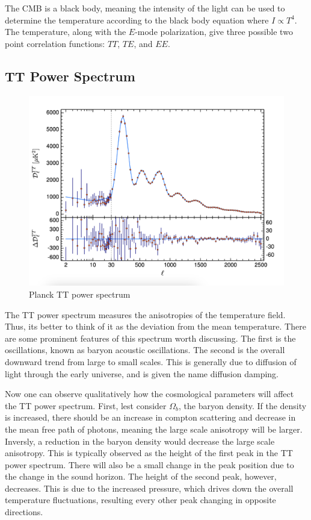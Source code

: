 The CMB is a black body, meaning the intensity of the light can be used to determine the temperature according to the black body equation where $I \propto T^4$. The temperature, along with the $E$-mode polarization, give three possible two point correlation functions: $TT$, $TE$, and $EE$.
\subsection{TT Power Spectrum}
\begin{figure}
    \centering
    \includegraphics[width=12cm]{plots/Planck_TT.png}
    \caption{Planck TT power spectrum}
    \label{fig:planck_tt}
\end{figure}
The TT power spectrum measures the anisotropies of the temperature field. Thus, its better to think of it as the deviation from the mean temperature. There are some prominent features of this spectrum worth discussing. The first is the oscillations, known as baryon acoustic oscillations. The second is the overall downward trend from large to small scales. This is generally due to diffusion of light through the early universe, and is given the name diffusion damping.

Now one can observe qualitatively how the cosmological parameters will affect the TT power spectrum. First, lest consider $\Omega_b$, the baryon density. If the density is increased, there should be an increase in compton scattering and decrease in the mean free path of photons, meaning the large scale anisotropy will be larger. Inversly, a reduction in the baryon density would decrease the large scale anisotropy. This is typically observed as the height of the first peak in the TT power spectrum. There will also be a small change in the peak position due to the change in the sound horizon. The height of the second peak, however, decreases. This is due to the increased pressure, which drives down the overall temperature fluctuations, resulting every other peak changing in opposite directions.

